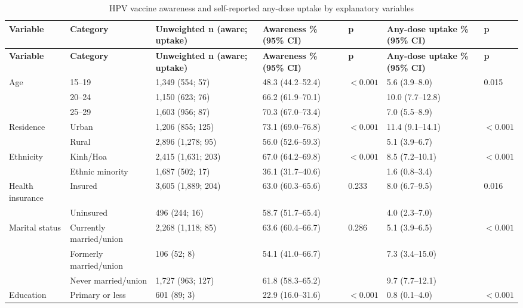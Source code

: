 \begingroup
\scriptsize
\setlength{\tabcolsep}{2pt}
\begin{longtable}{|p{1.8cm}|p{2.25cm}|p{2.0cm}|p{2.1cm}|p{0.75cm}|p{2.1cm}|p{0.75cm}|}
\caption[HPV awareness and any-dose uptake by variables]{HPV vaccine awareness and self-reported any-dose uptake by explanatory variables}
\label{tab:bivar_awareness_vaccination}\\
\hline
\textbf{Variable} & \textbf{Category} & \textbf{Unweighted n (aware; uptake)} & \textbf{Awareness \% (95\% CI)} & \textbf{p} & \textbf{Any-dose uptake \% (95\% CI)} & \textbf{p} \\
\hline
\endfirsthead
\hline
\textbf{Variable} & \textbf{Category} & \textbf{Unweighted n (aware; uptake)} & \textbf{Awareness \% (95\% CI)} & \textbf{p} & \textbf{Any-dose uptake \% (95\% CI)} & \textbf{p} \\
\hline
\endhead
Age & 15--19 & 1,349 (554; 57) & 48.3 (44.2--52.4) & $<0.001$ & 5.6 (3.9--8.0) & 0.015 \\
 & 20--24 & 1,150 (623; 76) & 66.2 (61.9--70.1) &  & 10.0 (7.7--12.8) &  \\
 & 25--29 & 1,603 (956; 87) & 70.3 (67.0--73.4) &  & 7.0 (5.5--8.9) &  \\
\hline
Residence & Urban & 1,206 (855; 125) & 73.1 (69.0--76.8) & $<0.001$ & 11.4 (9.1--14.1) & $<0.001$ \\
 & Rural & 2,896 (1,278; 95) & 56.0 (52.6--59.3) &  & 5.1 (3.9--6.7) &  \\
\hline
Ethnicity & Kinh/Hoa & 2,415 (1,631; 203) & 67.0 (64.2--69.8) & $<0.001$ & 8.5 (7.2--10.1) & $<0.001$ \\
 & Ethnic minority & 1,687 (502; 17) & 36.1 (31.7--40.6) &  & 1.6 (0.8--3.4) &  \\
\hline
Health insurance & Insured & 3,605 (1,889; 204) & 63.0 (60.3--65.6) & 0.233 & 8.0 (6.7--9.5) & 0.016 \\
 & Uninsured & 496 (244; 16) & 58.7 (51.7--65.4) &  & 4.0 (2.3--7.0) &  \\
\hline
Marital status & Currently married/union & 2,268 (1,118; 85) & 63.6 (60.4--66.7) & 0.286 & 5.1 (3.9--6.5) & $<0.001$ \\
 & Formerly married/union & 106 (52; 8) & 54.1 (41.0--66.7) &  & 7.3 (3.4--15.0) &  \\
 & Never married/union & 1,727 (963; 127) & 61.8 (58.3--65.2) &  & 9.7 (7.7--12.1) &  \\
\hline
Education & Primary or less & 601 (89; 3) & 22.9 (16.0--31.6) & $<0.001$ & 0.8 (0.1--4.0) & $<0.001$ \\

\end{longtable}
